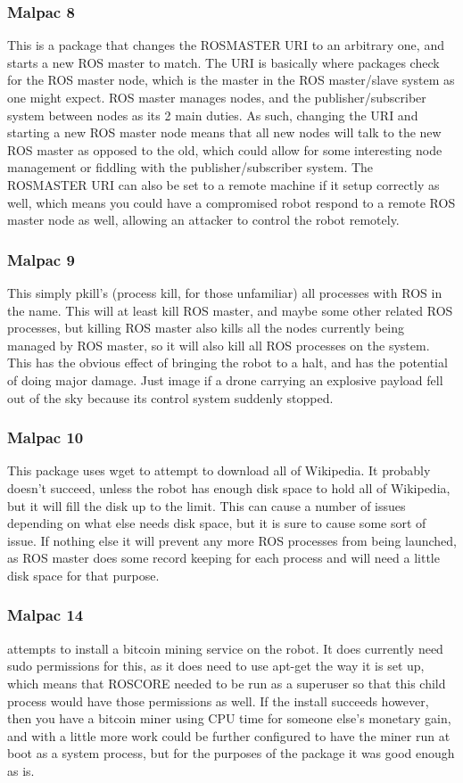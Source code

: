 \documentclass[IEEEtran,letterpaper,10pt,notitlepage,draftclsnofoot,onecolumn]{article}
\begin{document}
\subsubsection{Malpac 8}
This is a package that changes the ROSMASTER URI to an arbitrary one, and starts a new ROS master to match. 
The URI is basically where packages check for the ROS master node, which is the master in the ROS master/slave system as one might expect. 
ROS master manages nodes, and the publisher/subscriber system between nodes as its 2 main duties. 
As such, changing the URI and starting a new ROS master node means that all new nodes will talk to the new ROS master as opposed to the old, which could allow for some interesting node management or fiddling with the publisher/subscriber system. 
The ROSMASTER URI can also be set to a remote machine if it setup correctly as well, which means you could have a compromised robot respond to a remote ROS master node as well, allowing an attacker to control the robot remotely. 

\subsubsection{Malpac 9}
This simply pkill’s (process kill, for those unfamiliar) all processes with ROS in the name. 
This will at least kill ROS master, and maybe some other related ROS processes, but killing ROS master also kills all the nodes currently being managed by ROS master, so it will also kill all ROS processes on the system. 
This has the obvious effect of bringing the robot to a halt, and has the potential of doing major damage. 
Just image if a drone carrying an explosive payload fell out of the sky because its control system suddenly stopped.

\subsubsection{Malpac 10} 
This package uses wget to attempt to download all of Wikipedia. 
It probably doesn’t succeed, unless the robot has enough disk space to hold all of Wikipedia, but it will fill the disk up to the limit.
This can cause a number of issues depending on what else needs disk space, but it is sure to cause some sort of issue. 
If nothing else it will prevent any more ROS processes from being launched, as ROS master does some record keeping for each process and will need a little disk space for that purpose. 

\subsubsection{Malpac 14} 
attempts to install a bitcoin mining service on the robot. 
It does currently need sudo permissions for this, as it does need to use apt-get the way it is set up, which means that ROSCORE needed to be run as a superuser so that this child process would have those permissions as well. 
If the install succeeds however, then you have a bitcoin miner using CPU time for someone else’s monetary gain, and with a little more work could be further configured to have the miner run at boot as a system process, but for the purposes of the package it was good enough as is. 
\end{document}

